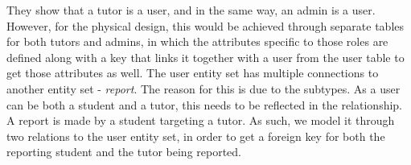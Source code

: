 They show that a tutor is a user, and in the same way, an admin is a user.
However, for the physical design, this would be achieved through separate tables for both tutors and admins, in which the attributes specific to those roles are defined along with a key that links it together with a user from the user table to get those attributes as well.
The user entity set has multiple connections to another entity set - \textit{report}.
The reason for this is due to the subtypes.
As a user can be both a student and a tutor, this needs to be reflected in the relationship.
A report is made by a student targeting a tutor.
As such, we model it through two relations to the user entity set, in order to get a foreign key for both the reporting student and the tutor being reported.
